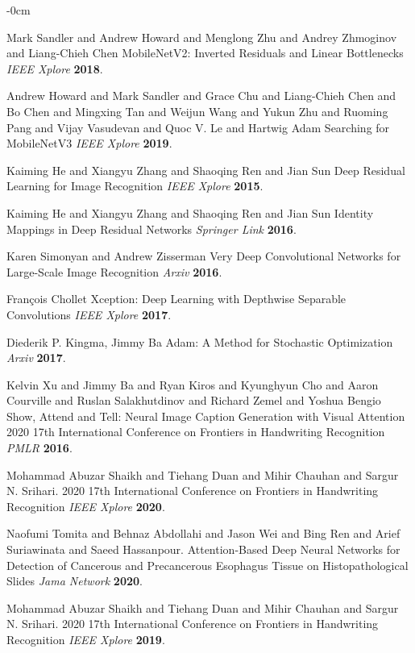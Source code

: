 \documentclass[sensors,article,submit,pdftex,moreauthors]{Definitions/mdpi}
\begin{document}
\begin{adjustwidth}{-\extralength}{0cm}
\begin{thebibliography}{999}
Mark Sandler and Andrew Howard and Menglong Zhu and Andrey Zhmoginov and Liang-Chieh Chen MobileNetV2: Inverted Residuals and Linear Bottlenecks
{\em IEEE Xplore} 
{\bf 2018}.

Andrew Howard and Mark Sandler and Grace Chu and Liang-Chieh Chen and Bo Chen and Mingxing Tan and Weijun Wang and Yukun Zhu and Ruoming Pang and Vijay Vasudevan and Quoc V. Le and Hartwig Adam Searching for MobileNetV3
{\em IEEE Xplore} 
{\bf 2019}.

Kaiming He and Xiangyu Zhang and Shaoqing Ren and Jian Sun Deep Residual Learning for Image Recognition
{\em IEEE Xplore} 
{\bf 2015}.

Kaiming He and Xiangyu Zhang and Shaoqing Ren and Jian Sun Identity Mappings in Deep Residual Networks
{\em Springer Link} 
{\bf 2016}.

Karen Simonyan and Andrew Zisserman Very Deep Convolutional Networks for Large-Scale Image Recognition
{\em Arxiv} 
{\bf 2016}.

François Chollet Xception: Deep Learning with Depthwise Separable Convolutions
{\em IEEE Xplore} 
{\bf 2017}.

Diederik P. Kingma, Jimmy Ba Adam: A Method for Stochastic Optimization
{\em Arxiv} 
{\bf 2017}.

Kelvin Xu and Jimmy Ba and Ryan Kiros and Kyunghyun Cho and Aaron Courville and Ruslan Salakhutdinov and Richard Zemel and Yoshua Bengio Show, Attend and Tell: Neural Image Caption Generation with Visual Attention 2020 17th International Conference on Frontiers in Handwriting Recognition
{\em PMLR} 
{\bf 2016}.

Mohammad Abuzar Shaikh and Tiehang Duan and Mihir Chauhan and Sargur N. Srihari. 2020 17th International Conference on Frontiers in Handwriting Recognition
{\em IEEE Xplore} 
{\bf 2020}.

Naofumi Tomita and Behnaz Abdollahi and Jason Wei and Bing Ren and Arief Suriawinata and Saeed Hassanpour. Attention-Based Deep Neural Networks for Detection of Cancerous and Precancerous Esophagus Tissue on Histopathological Slides
{\em Jama Network} 
{\bf 2020}.

Mohammad Abuzar Shaikh and Tiehang Duan and Mihir Chauhan and Sargur N. Srihari. 2020 17th International Conference on Frontiers in Handwriting Recognition
{\em IEEE Xplore} 
{\bf 2019}.


\end{thebibliography}
\end{adjustwidth}
\end{document}
